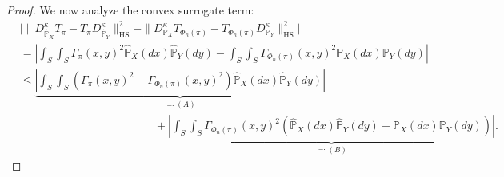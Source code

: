 \documentclass{article}
\begin{document}
\begin{proof}
	We now analyze the convex surrogate term:
	\begin{align*}
		&\Big\vert \|D_{\hat{\mathbb{P}}_X}^{\kappa} T_{\pi} - T_{\pi} D_{\hat{\mathbb{P}}_Y}^{\kappa} \|_{\mathrm{HS}}^2 - \|D_{\mathbb{P}_X}^{\kappa} T_{\Phi_n(\pi)} - T_{\Phi_n(\pi)} D_{\mathbb{P}_Y}^{\kappa} \|_{\mathrm{HS}}^2 \Big\vert \\
		&= \left\vert \int_S\int_S \Gamma_{\pi}(x,y)^2\hat{\mathbb{P}}_X(dx)\hat{\mathbb{P}}_Y(dy) - \int_S\int_S \Gamma_{\Phi_n(\pi)}(x,y)^2 \mathbb{P}_X(dx)\mathbb{P}_Y(dy) \right\vert \\
		&\leq \underbrace{\left\vert \int_S\int_S (\Gamma_{\pi}(x,y)^2 - \Gamma_{\Phi_n(\pi)}(x,y)^2)\hat{\mathbb{P}}_X(dx)\hat{\mathbb{P}}_Y(dy) \right\vert}_{\eqqcolon (A)} \\
		&\qquad\qquad\qquad\qquad\qquad\qquad + \underbrace{\left\vert \int_S\int_S \Gamma_{\Phi_n(\pi)}(x,y)^2 (\hat{\mathbb{P}}_X(dx)\hat{\mathbb{P}}_Y(dy) - \mathbb{P}_X(dx)\mathbb{P}_Y(dy)) \right\vert}_{\eqqcolon (B)} .
	\end{align*}
	

\end{proof}
\end{document}
